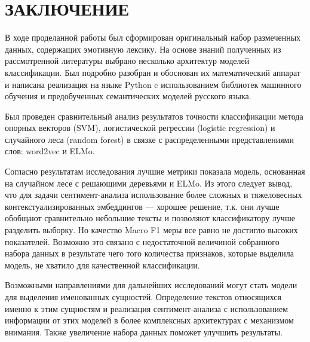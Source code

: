 \chapter*{ЗАКЛЮЧЕНИЕ}

В ходе проделанной работы был сформирован оригинальный набор размеченных данных, содержащих эмотивную лексику. На основе знаний полученных из рассмотренной литературы выбрано несколько архитектур моделей классификации. Был подробно разобран и обоснован их математический аппарат и написана реализация на языке Python c использованием библиотек машинного обучения и предобученных семантических моделей русского языка.

\bigskip
Был проведен сравнительный анализ результатов точности классификации метода опорных векторов (SVM), логистической регрессии (logistic regression) и случайного леса (random forest) в связке с распределенными представлениями слов: word2vec и ELMo.

\bigskip
Согласно результатам исследования лучшие метрики показала модель, основанная на случайном лесе с решающими деревьями и ELMo. Из этого следует вывод, что для задачи сентимент-анализа использование более сложных и тяжеловесных контекстуализированных эмбеддингов --- хорошее решение, т.к. они лучше обобщают сравнительно небольшие тексты и позволяют классификатору лучше разделить выборку. Но качество Macro F1 меры все равно не достигло высоких показателей. Возможно это связано с недостаточной величиной собранного набора данных в результате чего того  количества признаков, которые выделила модель, не хватило для качественной классификации.

\bigskip
Возможными направлениями для дальнейших исследований могут стать модели для выделения именованных сущностей. Определение текстов относящихся именно к этим сущностям и реализация сентимент-анализа с использованием информации от этих моделей в более комплексных архитектурах с механизмом внимания. Также увеличение набора данных поможет улучшить результаты.

































